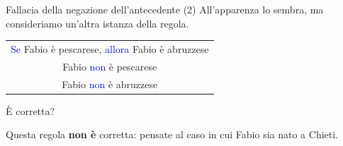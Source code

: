 \documentclass[aspectratio=169,10pt]{beamer}
\newcommand{\xmark}{{\color{red}{\ding{55}}}}
\newcommand{\conn}[1]{\textcolor{blue}{#1}}
\newenvironment{inference}{\begin{tabular}{c}}{\end{tabular}}
\begin{document}
\begin{frame}{Fallacia della negazione dell'antecedente (2)}
   All'apparenza lo sembra, ma consideriamo un'altra istanza della regola.
   \begin{center}
   \begin{inference}
        \conn{Se} Fabio è pescarese, \conn{allora} Fabio è abruzzese \only<3->{\checkmark}\\
        Fabio \conn{non} è pescarese \only<4->{\checkmark}\\
        \hline
        Fabio \conn{non} è abruzzese \only<5->{\xmark}
    \end{inference}
   \end{center}
   È corretta?

   \pause
   \medskip
   Questa regola \textbf{non è} corretta: pensate al caso in cui Fabio sia nato a Chieti.


\end{frame}
\end{document}
